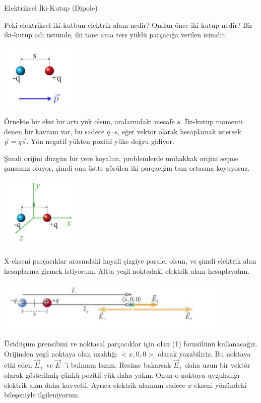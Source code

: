 \documentclass[12pt,fleqn]{article}\usepackage{../../common}
\begin{document}
Elektriksel İki-Kutup (Dipole)

Peki elektriksel iki-kutbun elektrik alanı nedir? Ondan önce iki-kutup nedir?
Bir iki-kutup adı üstünde, iki tane ama ters yüklü parçacığa verilen isimdir.

\includegraphics[width=10em]{02_08.png}

Örnekte bir eksi bir artı yük olsun, aralarındaki mesafe $s$. İki-kutup momenti
denen bir kavram var, bu sadece $q \cdot s$, eğer vektör olarak hesaplamak
istersek $\vec{p} = q \vec{s}$. Yön negatif yükten pozitif yüke doğru gidiyor.

Şimdi orijini düzgün bir yere koyalım, problemlerde muhakkak orijini seçme
şansımız oluyor, şimdi onu üstte görülen iki parçacığın tam ortasına koyuyoruz.

\includegraphics[width=10em]{02_09.png}

X-ekseni parçacıklar arasındaki hayali çizgiye paralel olsun, ve şimdi elektrik
alan hesaplarına girmek istiyorum. Altta yeşil noktadaki elektrik alanı
hesaplayalım.

\includegraphics[width=30em]{02_10.png}

Üstdüşüm prensibini ve noktasal parçacıklar için olan (1) formülünü
kullanacağız. Orijinden yeşil noktaya olan uzaklığı $<x,0,0>$ olarak
yazabiliriz. Bu noktaya etki eden $\vec{E}_{+}$ ve $\vec{E}_{-}$'i bulmam
lazım. Resime bakarsak $\vec{E}_{+}$ daha uzun bir vektör olarak gösterilmiş
çünkü pozitif yük daha yakın. Onun o noktaya uyguladığı elektrik alan daha
kuvvetli. Ayrıca elektrik alanının sadece $x$ ekseni yönündeki bileşeniyle
ilgileniyorum.
\end{document}
